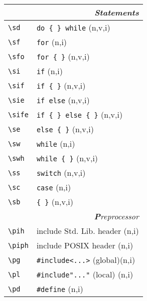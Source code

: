\documentclass[oneside,11pt,landscape,DIV16]{scrartcl}
\begin{document}
\begin{multicols}{3}
\begin{center}
%
\begin{tabular}[]{|p{15mm}|p{55mm}|}
\hline
\multicolumn{2}{|r|}{\textsl{\textbf{S}tatements}} \\
\hline \verb'\sd'  & \verb'do { } while'        \hfill (n,v,i)\\
\hline \verb'\sf'  & \verb'for'                 \hfill (n,i)\\
\hline \verb'\sfo' & \verb'for { }'             \hfill (n,v,i)\\
\hline \verb'\si'  & \verb'if'                  \hfill (n,i)\\
\hline \verb'\sif' & \verb'if { }'              \hfill (n,v,i)\\
\hline \verb'\sie' & \verb'if else'             \hfill (n,v,i)\\
\hline \verb'\sife'& \verb'if { } else { }'     \hfill (n,v,i)\\
\hline \verb'\se'  & \verb'else { }'            \hfill (n,v,i)\\
\hline \verb'\sw'  & \verb'while'               \hfill (n,i)\\
\hline \verb'\swh' & \verb'while { }'           \hfill (n,v,i)\\
\hline \verb'\ss'  & \verb'switch'              \hfill (n,v,i)\\
\hline \verb'\sc'  & \verb'case'                \hfill (n,i)\\
\hline \verb'\sb'  & \verb'{ }'                 \hfill (n,v,i)\\
\hline
\hline
\multicolumn{2}{|r|}{\textsl{\textbf{P}reprocessor}}   \\
\hline \verb'\pih'  & include Std. Lib. header     \hfill (n,i)\\
\hline \verb'\piph' & include POSIX header         \hfill (n,i)\\
\hline \verb'\pg'   & \verb$#include<...>$ (global)\hfill (n,i)\\
\hline \verb'\pl'   & \verb$#include"..."$ (local) \hfill (n,i)\\
\hline \verb'\pd'   & \verb'#define'               \hfill (n,i)\\

\end{tabular}
\end{center}
\end{multicols}
\end{document}
